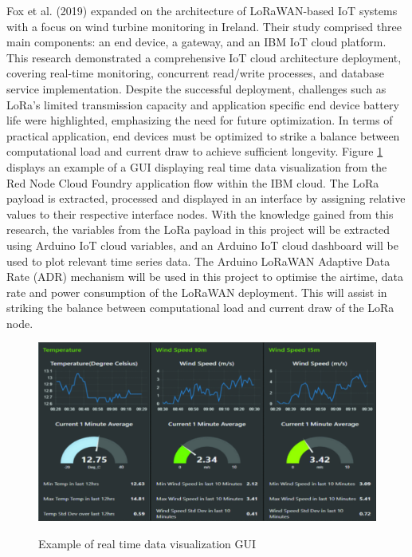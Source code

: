 Fox et al. (2019) \cite{IoT-Regional-Service} expanded on the architecture of LoRaWAN-based IoT systems with a focus on wind turbine monitoring in Ireland. Their study comprised three main components: an end device, a gateway, and an IBM IoT cloud platform. This research demonstrated a comprehensive IoT cloud architecture deployment, covering real-time monitoring, concurrent read/write processes, and database service implementation. Despite the successful deployment, challenges such as LoRa's limited transmission capacity and application specific end device battery life were highlighted, emphasizing the need for future optimization. In terms of practical application, end devices must be optimized to strike a balance between computational load and current draw to achieve sufficient longevity. Figure \ref{Example-GUI} displays an example of a GUI displaying real time data visualization from the Red Node Cloud Foundry application flow within the IBM cloud. The LoRa payload is extracted, processed and displayed in an interface by assigning relative values to their respective interface nodes. With the knowledge gained from this research, the variables from the LoRa payload in this project will be extracted using Arduino IoT cloud variables, and an Arduino IoT cloud dashboard will be used to plot relevant time series data. The Arduino LoRaWAN Adaptive Data Rate (ADR) mechanism will be used in this project to optimise the airtime, data rate and power consumption of the LoRaWAN deployment. This will assist in striking the balance between computational load and current draw of the LoRa node. 

\begin{figure}[h]
	\centering
	\caption{Example of real time data visualization GUI \cite{IoT-Regional-Service}}
	\includegraphics[scale=0.6]{Sections/Literature-Review/Example-GUI.pdf}
	\label{Example-GUI}
\end{figure}


